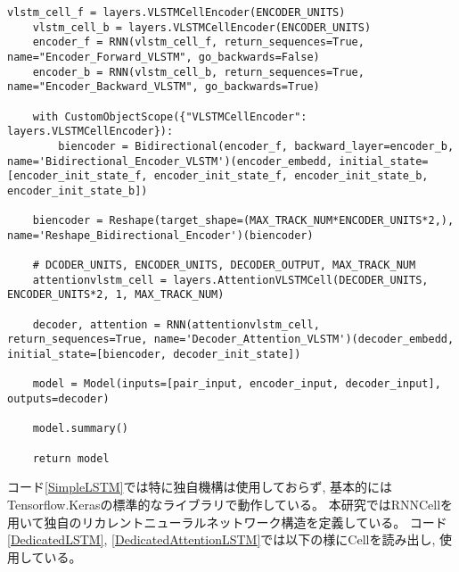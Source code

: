 \begin{lstlisting}[caption=独自のAttention LSTM, label=DedicatedAttentionLSTM]
    vlstm_cell_f = layers.VLSTMCellEncoder(ENCODER_UNITS)
    vlstm_cell_b = layers.VLSTMCellEncoder(ENCODER_UNITS)
    encoder_f = RNN(vlstm_cell_f, return_sequences=True, name="Encoder_Forward_VLSTM", go_backwards=False)
    encoder_b = RNN(vlstm_cell_b, return_sequences=True, name="Encoder_Backward_VLSTM", go_backwards=True)

    with CustomObjectScope({"VLSTMCellEncoder": layers.VLSTMCellEncoder}):
        biencoder = Bidirectional(encoder_f, backward_layer=encoder_b, name='Bidirectional_Encoder_VLSTM')(encoder_embedd, initial_state=[encoder_init_state_f, encoder_init_state_f, encoder_init_state_b, encoder_init_state_b])

    biencoder = Reshape(target_shape=(MAX_TRACK_NUM*ENCODER_UNITS*2,), name='Reshape_Bidirectional_Encoder')(biencoder)

    # DCODER_UNITS, ENCODER_UNITS, DECODER_OUTPUT, MAX_TRACK_NUM
    attentionvlstm_cell = layers.AttentionVLSTMCell(DECODER_UNITS, ENCODER_UNITS*2, 1, MAX_TRACK_NUM)
    
    decoder, attention = RNN(attentionvlstm_cell, return_sequences=True, name='Decoder_Attention_VLSTM')(decoder_embedd, initial_state=[biencoder, decoder_init_state])
    
    model = Model(inputs=[pair_input, encoder_input, decoder_input], outputs=decoder)

    model.summary()

    return model
\end{lstlisting}

コード\ref{SimpleLSTM}では特に独自機構は使用しておらず, 基本的にはTensorflow.Kerasの標準的なライブラリで動作している。
本研究ではRNNCellを用いて独自のリカレントニューラルネットワーク構造を定義している。
コード\ref{DedicatedLSTM}, \ref{DedicatedAttentionLSTM}では以下の様にCellを読み出し, 使用している。

